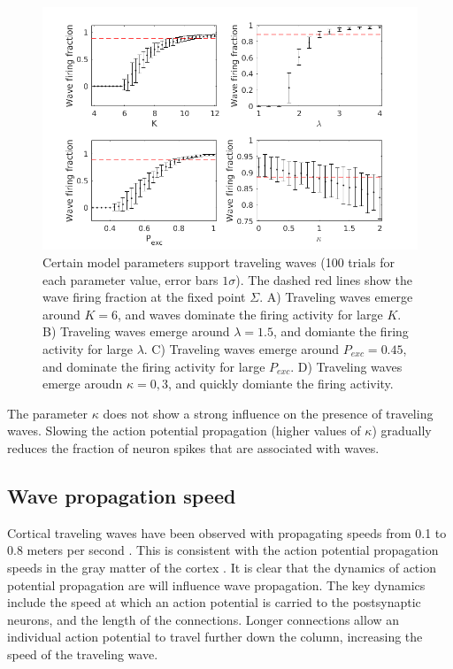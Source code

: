 \documentclass[a4paper,11pt]{article}
\begin{document}
\begin{figure}[!htb]
 \centering
 \includegraphics[width=\textwidth]{fig/ParamWaveSim}
 \caption{Certain model parameters support traveling waves (100 trials for each parameter value, error bars $1\sigma$). The dashed red lines show the wave firing fraction at the fixed point $\Sigma$. A) Traveling waves emerge around $K=6$, and waves dominate the firing activity for large $K$. B) Traveling waves emerge around $\lambda=1.5$, and domiante the firing activity for large $\lambda$. C) Traveling waves emerge around $P_{exc}=0.45$, and dominate the firing activity for large $P_{exc}$. D) Traveling waves emerge aroudn $\kappa=0,3$, and quickly domiante the firing activity. }
 \label{fig:wave_parameters}
\end{figure}

\FloatBarrier

The parameter $\kappa$ does not show a strong influence on the presence of traveling waves. 
Slowing the action potential propagation (higher values of $\kappa$) gradually reduces the fraction of neuron spikes that are associated with waves.


\subsection{Wave propagation speed} \label{sub:propagation_speed}
Cortical traveling waves have been observed with propagating speeds from 0.1 to 0.8 meters per second \cite{sato2012}.
This is consistent with the action potential propagation speeds in the gray matter of the cortex \cite{muller2018}.
It is clear that the dynamics of action potential propagation are will influence wave propagation.
The key dynamics include the speed at which an action potential is carried to the postsynaptic neurons, and the length of the connections.
Longer connections allow an individual action potential to travel further down the column, increasing the speed of the traveling wave.
\end{document}
